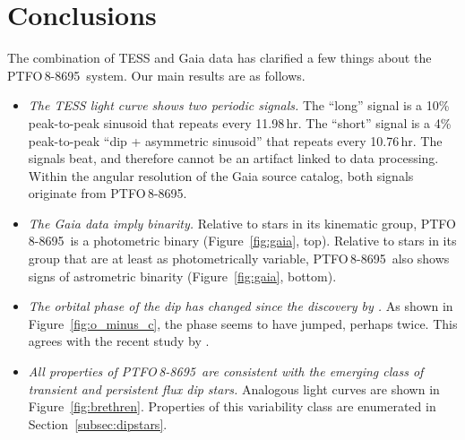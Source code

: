 \documentclass[12pt,twocolumn,tighten]{aastex62}
\newcommand{\ptfo}{PTFO$\,$8-8695}
\begin{document}

\section{Conclusions}
\label{sec:conclusions}

The combination of TESS and Gaia data has clarified a few things about
the \ptfo\ system.  Our main results are as follows.
\begin{itemize}
  \item {\it The TESS light curve shows two periodic signals.} The
    ``long'' signal is a 10\% peak-to-peak sinusoid that repeats every
    11.98$\,$hr.  The ``short'' signal is a 4\% peak-to-peak ``dip +
    asymmetric sinusoid'' that repeats every 10.76$\,$hr. The signals
    beat, and therefore cannot be an artifact linked to data
    processing.  Within the angular resolution of the Gaia source
    catalog, both signals originate from \ptfo.
  \item {\it The Gaia data imply binarity.} Relative to stars in its
    kinematic group, \ptfo\ is a photometric binary
    (Figure~\ref{fig:gaia}, top).  Relative to stars in its group that
    are at least as photometrically variable, \ptfo\ also shows signs
    of astrometric binarity (Figure~\ref{fig:gaia}, bottom).
  \item {\it The orbital phase of the dip has changed since the
    discovery by \citet{van_eyken_ptf_2012}.} As shown in
    Figure~\ref{fig:o_minus_c}, the phase seems to have jumped,
    perhaps twice. This agrees with the recent study by
    \citet{tanimoto_evidence_2020}.
  \item {\it All properties of \ptfo\ are consistent with the emerging
    class of transient and persistent flux dip stars.} Analogous
    light curves are shown in Figure~\ref{fig:brethren}.  Properties of
    this variability class are enumerated in
    Section~\ref{subsec:dipstars}.
\end{itemize}
\end{document}
